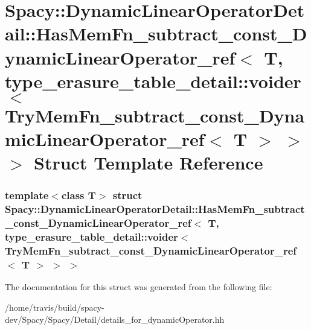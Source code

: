 \hypertarget{structSpacy_1_1DynamicLinearOperatorDetail_1_1HasMemFn__subtract__const__DynamicLinearOperator__7adeb5ae5f014928c4ee471bca0daa2f}{\section{\-Spacy\-:\-:\-Dynamic\-Linear\-Operator\-Detail\-:\-:\-Has\-Mem\-Fn\-\_\-subtract\-\_\-const\-\_\-\-Dynamic\-Linear\-Operator\-\_\-ref$<$ \-T, type\-\_\-erasure\-\_\-table\-\_\-detail\-:\-:voider$<$ \-Try\-Mem\-Fn\-\_\-subtract\-\_\-const\-\_\-\-Dynamic\-Linear\-Operator\-\_\-ref$<$ \-T $>$ $>$ $>$ \-Struct \-Template \-Reference}
\label{structSpacy_1_1DynamicLinearOperatorDetail_1_1HasMemFn__subtract__const__DynamicLinearOperator__7adeb5ae5f014928c4ee471bca0daa2f}
}
\subsubsection*{template$<$class T$>$ struct Spacy\-::\-Dynamic\-Linear\-Operator\-Detail\-::\-Has\-Mem\-Fn\-\_\-subtract\-\_\-const\-\_\-\-Dynamic\-Linear\-Operator\-\_\-ref$<$ T, type\-\_\-erasure\-\_\-table\-\_\-detail\-::voider$<$ Try\-Mem\-Fn\-\_\-subtract\-\_\-const\-\_\-\-Dynamic\-Linear\-Operator\-\_\-ref$<$ T $>$ $>$ $>$}



\-The documentation for this struct was generated from the following file\-:\begin{DoxyCompactItemize}
\item 
/home/travis/build/spacy-\/dev/\-Spacy/\-Spacy/\-Detail/details\-\_\-for\-\_\-dynamic\-Operator.\-hh\end{DoxyCompactItemize}
